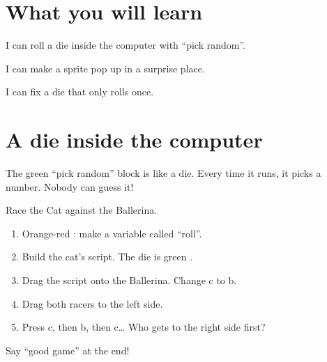 
\section{What you will learn}
\begin{ican}
  \item I can roll a die inside the computer with \enquote{pick random}.
  \item I can make a sprite pop up in a surprise place.
  \item I can fix a die that only rolls once.
\end{ican}

\section{A die inside the computer}
The green \enquote{pick random} block is like a die. Every time it runs, it picks a number. Nobody can guess it!

\begin{exercise}
Race the Cat against the Ballerina.
\begin{enumerate}[leftmargin=1.4em,itemsep=2pt]
  \item Orange-red : make a variable called \enquote{roll}.
  \item Build the cat's script. The die is green .
  \item Drag the script onto the Ballerina. Change c to b.
  \item Drag both racers to the left side.
  \item Press c, then b, then c\ldots{} Who gets to the right side first?
\end{enumerate}
\begin{center}
\begin{scratch}[scale=0.85]
\end{scratch}
\end{center}
Say \enquote{good game} at the end!
\end{exercise}

